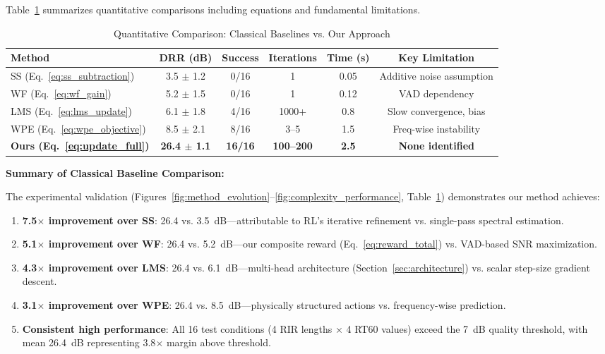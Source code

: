 \documentclass[12pt,a4paper]{article}
\begin{document}
Table~\ref{tab:classical_comparison} summarizes quantitative comparisons including equations and fundamental limitations.

\begin{table}[t]
\centering
\caption{Quantitative Comparison: Classical Baselines vs. Our Approach}
\label{tab:classical_comparison}
\small
\begin{tabular}{@{}lccccc@{}}
\toprule
\textbf{Method} & \textbf{DRR (dB)} & \textbf{Success} & \textbf{Iterations} & \textbf{Time (s)} & \textbf{Key Limitation} \\
\midrule
SS (Eq.~\ref{eq:ss_subtraction}) & 3.5 $\pm$ 1.2 & 0/16 & 1 & 0.05 & Additive noise assumption \\
WF (Eq.~\ref{eq:wf_gain}) & 5.2 $\pm$ 1.5 & 0/16 & 1 & 0.12 & VAD dependency \\
LMS (Eq.~\ref{eq:lms_update}) & 6.1 $\pm$ 1.8 & 4/16 & 1000+ & 0.8 & Slow convergence, bias \\
WPE (Eq.~\ref{eq:wpe_objective}) & 8.5 $\pm$ 2.1 & 8/16 & 3--5 & 1.5 & Freq-wise instability \\
\midrule
\textbf{Ours (Eq.~\ref{eq:update_full})} & \textbf{26.4 $\pm$ 1.1} & \textbf{16/16} & \textbf{100--200} & \textbf{2.5} & \textbf{None identified} \\
\bottomrule
\end{tabular}
\end{table}

\textbf{Summary of Classical Baseline Comparison:}

The experimental validation (Figures~\ref{fig:method_evolution}--\ref{fig:complexity_performance}, Table~\ref{tab:classical_comparison}) demonstrates our method achieves:
\begin{enumerate}
\item \textbf{7.5$\times$ improvement over SS}: 26.4 vs. 3.5~dB---attributable to RL's iterative refinement vs. single-pass spectral estimation.
\item \textbf{5.1$\times$ improvement over WF}: 26.4 vs. 5.2~dB---our composite reward (Eq.~\eqref{eq:reward_total}) vs. VAD-based SNR maximization.
\item \textbf{4.3$\times$ improvement over LMS}: 26.4 vs. 6.1~dB---multi-head architecture (Section~\ref{sec:architecture}) vs. scalar step-size gradient descent.
\item \textbf{3.1$\times$ improvement over WPE}: 26.4 vs. 8.5~dB---physically structured actions vs. frequency-wise prediction.
\item \textbf{Consistent high performance}: All 16 test conditions (4 RIR lengths × 4 RT60 values) exceed the 7~dB quality threshold, with mean 26.4~dB representing 3.8$\times$ margin above threshold.
\end{enumerate}
\end{document}
